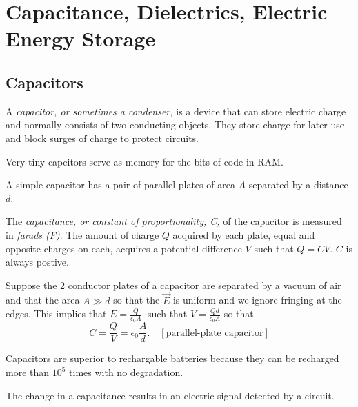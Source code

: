 \chapter{Capacitance, Dielectrics, Electric Energy Storage}

\section{Capacitors}

\begin{definition}[Capacitor]
    A \emph{capacitor, or sometimes a condenser,} is a device that can store electric charge and normally consists of two conducting objects. They store charge for later use and block surges of charge to protect circuits.
\end{definition}
\begin{note}
    Very tiny capcitors serve as memory for the bits of code in RAM.
\end{note}
\begin{remark}
    A simple capacitor has a pair of parallel plates of area $A$ separated by a distance $d$.
\end{remark}
\begin{definition}[Capacitance]
    The \emph{capacitance, or constant of proportionality, C,} of the capacitor is measured in \emph{farads (F)}. The amount of charge $Q$ acquired by each plate, equal and opposite charges on each, acquires a potential difference $V$ such that $Q = CV.$ $C$ is always postive.
\end{definition}
\begin{remark}
    Suppose the 2 conductor plates of a capacitor are separated by a vacuum of air and that the area $A \gg d$ so that the $\vec{E}$ is uniform and we ignore fringing at the edges. This implies that $E = \frac{Q}{\epsilon_0A}.$ such that $V = \frac{Qd}{\epsilon_0A}$ so that $$C = \frac{Q}{V} = \epsilon_0\frac{A}{d}. \quad [\text{parallel-plate capacitor}]$$ 
\end{remark}
\begin{note}
    Capacitors are superior to rechargable batteries because they can be recharged more than $10^5$ times with no degradation.
\end{note}
\begin{note}
    The change in a capacitance results in an electric signal detected by a circuit.
\end{note}
